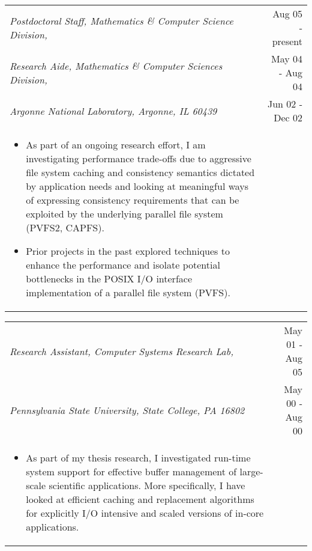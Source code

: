 \documentclass{article}
\begin{document}
  \begin{center}

	\normalsize
	\begin{tabularx}{6.2in}{Xr}
	\vspace*{-0.09truein}
	\emph{Postdoctoral Staff, Mathematics \& Computer Science Division,} & Aug 05 - present \\
	\emph{Research Aide, Mathematics \& Computer Sciences Division,} & May 04 - Aug 04	\\
	\emph{Argonne National Laboratory, Argonne, IL 60439} & Jun 02 - Dec 02 \\
	\vspace*{-2pt}
	\begin{itemize}
	\small
	\item {As part of an ongoing research effort, I am investigating performance trade-offs due to 
	aggressive file system caching and consistency semantics dictated by application needs and looking
	at meaningful ways of expressing consistency requirements that can be exploited by the underlying
	parallel file system (PVFS2, CAPFS).} 
	\item {Prior projects in the past explored techniques to enhance the performance and isolate 
	potential bottlenecks in the POSIX I/O 
	interface implementation of a parallel file system (PVFS).} 
	\end{itemize}
	\end{tabularx}

	\normalsize
	\begin{tabularx}{6.2in}{Xr}
	\emph{Research Assistant, Computer Systems Research Lab,} & May 01 - Aug 05 \\
	\emph{Pennsylvania State University, State College, PA 16802}  & May 00 - Aug 00 \\
	\vspace*{-2pt}
	\begin{itemize}
	\small
	\item {As part of my thesis research, I investigated run-time system support for effective
	 buffer management of large-scale scientific applications. More specifically, I have
	 looked at efficient caching and replacement algorithms for explicitly I/O intensive
	 and scaled versions of in-core applications.}
	\end{itemize}
	\end{tabularx}


\end{center}
\end{document}
